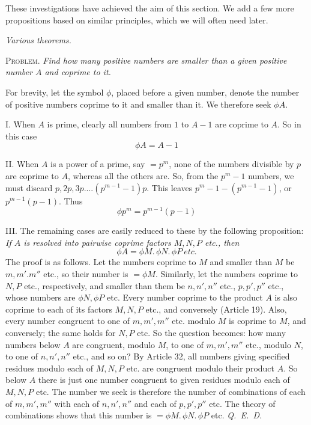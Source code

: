 These investigations have achieved the aim of this section. We add a few more propositions based on similar principles, which we will often need later.

\begin{center}\emph{Various theorems.}\end{center}

\textsc{Problem.} \emph{Find how many positive numbers are smaller than a given positive number $A$ and coprime to it.}

For brevity, let the symbol $\phi$, placed before a given number, denote the number of positive numbers coprime to it and smaller than it. We therefore seek $\phi A$.

I. When $A$ is prime, clearly all numbers from $1$ to $A-1$ are coprime to $A$. So in this case
\[\phi A=A-1\]

II. When $A$ is a power of a prime, say $=p^m$, none of the numbers divisible by $p$ are coprime to $A$, whereas all the others are. So, from the $p^m-1$ numbers, we must discard $p,2p,3p....(p^{m-1}-1)p$. This leaves $p^m-1-(p^{m-1}-1)$, or $p^{m-1}(p-1)$. Thus
\[\phi p^m=p^{m-1}(p-1)\]

III. The remaining cases are easily reduced to these by the following proposition: \emph{If $A$ is resolved into pairwise coprime factors $M,N,P$ etc., then}
\[\phi A=\phi M.\,\phi N.\,\phi P\ \textit{etc.}\]
The proof is as follows. Let the numbers coprime to $M$ and smaller than $M$ be $m,m'.m''$ etc., so their number is $=\phi M$. Similarly, let the numbers coprime to $N,P$ etc., respectively, and smaller than them be $n,n',n''$ etc., $p,p',p''$ etc., whose numbers are $\phi N,\phi P$ etc. Every number coprime to the product $A$ is also coprime to each of its factors $M,N,P$ etc., and conversely (Article 19). Also, every number congruent to one of $m,m',m''$ etc. modulo $M$ is coprime to $M$, and conversely; the same holds for $N,P$ etc. So the question becomes: how many numbers below $A$ are congruent, modulo $M$, to one of $m,m',m''$ etc., modulo $N$, to one of $n,n',n''$
etc., and so on? By Article 32, all numbers giving specified residues modulo each of $M,N,P$ etc. are congruent modulo their product $A$. So below $A$ there is just one number congruent to given residues modulo each of $M,N,P$ etc. The number we seek is therefore the number of combinations of each of $m,m',m''$ with each of $n,n',n''$ and each of $p,p',p''$ etc. The theory of combinations shows that this number is $=\phi M.\,\phi N.\,\phi P$ etc. \mbox{\emph{Q. E. D.}}

